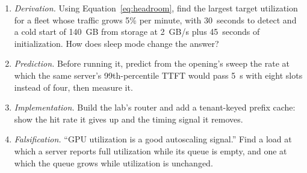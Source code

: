 \begin{enumerate}
\item \emph{Derivation.} Using Equation~\ref{eq:headroom}, find the largest
  target utilization for a fleet whose traffic grows 5\% per minute, with
  30~seconds to detect and a cold start of 140~GB from storage at 2~GB/s plus
  45~seconds of initialization. How does sleep mode change the answer?
\item \emph{Prediction.} Before running it, predict from the opening's sweep the
  rate at which the same server's 99th-percentile TTFT would pass 5~s with eight
  slots instead of four, then measure it.
\item \emph{Implementation.} Build the lab's router and add a tenant-keyed
  prefix cache: show the hit rate it gives up and the timing signal it removes.
\item \emph{Falsification.} ``GPU utilization is a good autoscaling signal.''
  Find a load at which a server reports full utilization while its queue is
  empty, and one at which the queue grows while utilization is unchanged.
\end{enumerate}
